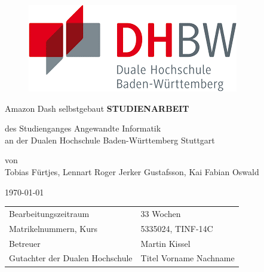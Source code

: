 \begin{figure}[!htb]
%
  \includegraphics[width=\linewidth]{DHBW-Logo.png}
  \label{fig:awesome_image3}
\endminipage
\end{figure}

\begin{center}
\vfill
{\Large Amazon Dash selbstgebaut}
\vfill
\textbf{STUDIENARBEIT}
\vfill

des Studienganges Angewandte Informatik\\
\vspace{12pt}
an der Dualen Hochschule Baden-Württemberg Stuttgart
\vfill

von\\
\vspace{12pt}
Tobias Fürtjes, Lennart Roger Jerker Gustafsson, Kai Fabian Oswald
\vfill

\today
\vfill

\begin{tabular}{ll}
Bearbeitungszeitraum & 33 Wochen \\
Matrikelnummern, Kurs & 5335024, TINF-14C \\
Betreuer & Martin Kissel \\
Gutachter der Dualen Hochschule	& Titel Vorname Nachname \\
\end{tabular}

\end{center}